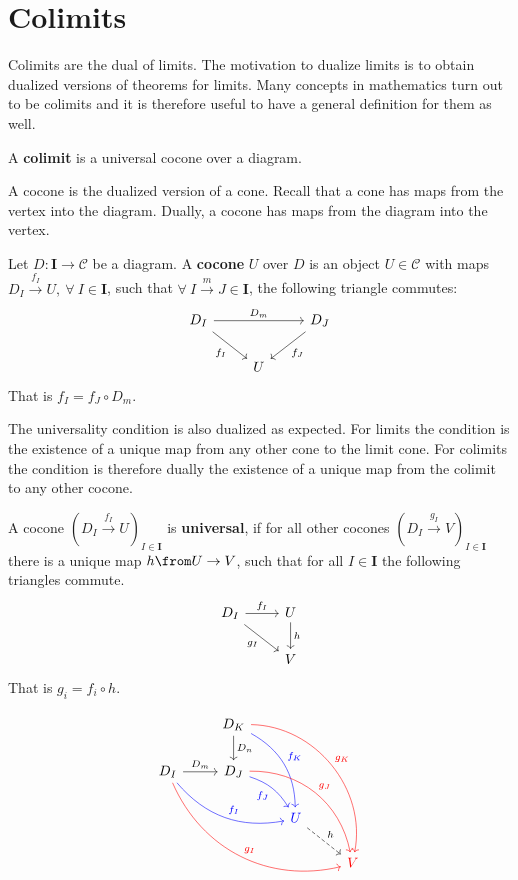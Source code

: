 \section{Colimits}
 Colimits are the dual of limits.
The motivation to dualize limits is to obtain dualized versions of theorems for limits.
Many concepts in mathematics turn out to be colimits and it is
therefore useful to have a general definition for them as well.
\begin{definition}
  A \textbf{colimit} is a universal cocone over a diagram.
\end{definition}
A cocone is the dualized version of a cone.
Recall that a cone has maps from the vertex into the diagram. Dually,
a cocone has maps from the diagram into the vertex.
\begin{definition}
  Let $D : \bm I \to \mathscr C$ be a diagram.
  A \textbf{cocone} $U$ over $D$ is an object $U \in \mathscr{C}$
  with maps $D_I \overset{ f_I}{\rightarrow} U,\ \forall\ I \in \bm{I}$, such that
  $\forall\ I \overset{m}{\to} J \in \bm{I}$, the following triangle commutes:
  \[
    \begin{tikzcd}
      D_I \arrow[rr, "D_m"]\arrow[dr, swap, "f_I"] & & D_J \arrow{dl}{f_J}\\
      & U  &
    \end{tikzcd}
  \]
  That is $f_I = f_J \circ D_m$.
\end{definition}
The universality condition is also dualized as expected.
For limits the condition is the existence of a unique map from
any other cone to the limit cone.
For colimits the condition is therefore dually the existence of a unique map
from the colimit to any other cocone.
\begin{definition}
  A cocone $(D_I\overset{f_I}{\to} U)_{I\in \bm{I}}$ is \textbf{universal}, if
  for all other cocones $(D_I \overset{g_I}{\to} V)_{I\in \bm{I}}$ there is a unique
  map $h \from U \to V$, such that for all $I \in \bm{I}$
  the following triangles commute.
  \[
    \begin{tikzcd}
      D_I \arrow[dr, swap, "g_I"] \arrow{r}{f_I} & U \arrow{d}{h} \\
      & V
    \end{tikzcd}
  \]
  That is $g_i = f_i \circ h$.
\end{definition}
\begin{example}
  \[
    \begin{tikzcd}
      & D_K \arrow{d}{D_n}
      \arrow[bend left=30,color=blue]{ddr}{f_K}
      \arrow[bend left=50,color=red]{dddrr}{g_K} & & \\
      D_I \arrow{r}{D_m}
      \arrow[bend right=30,color=blue]{drr}{f_I}
      \arrow[bend right=40,color=red]{ddrrr}{g_I} &
      D_J \arrow[bend left=20,swap, color=blue]{dr}{f_J}
      \arrow[bend left=40,color=red]{ddrr}{g_J} & & \\
      & & {\color{blue}U} \arrow[dashed]{dr}{h}& \\
      & & & {\color{red}V}
    \end{tikzcd}
  \]
\end{example}


